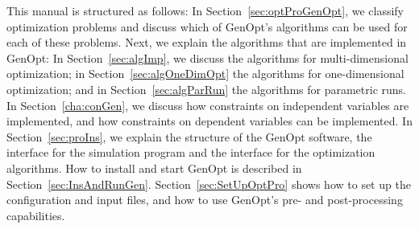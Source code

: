 This manual is structured as follows:
In Section~\ref{sec:optProGenOpt}, we classify optimization problems 
and discuss which of GenOpt's algorithms can be used for each of these problems.
Next, we explain the algorithms that are implemented in GenOpt:
In Section~\ref{sec:algImp}, we discuss the algorithms 
for multi-dimensional optimization;
in Section~\ref{sec:algOneDimOpt} the algorithms for 
one-dimensional optimization;
and
in Section~\ref{sec:algParRun} the algorithms for parametric runs.
In Section~\ref{cha:conGen}, we discuss how constraints on independent variables are
implemented, and how constraints on dependent variables can be implemented.
In Section~\ref{sec:proIns}, we explain 
the structure of the GenOpt software,
the interface for the simulation program and 
the interface for the optimization algorithms.
How to install and start GenOpt is described in Section~\ref{sec:InsAndRunGen}.
Section~\ref{sec:SetUpOptPro} shows how to set up the configuration and input files,
and how to use GenOpt's pre- and post-processing capabilities.



